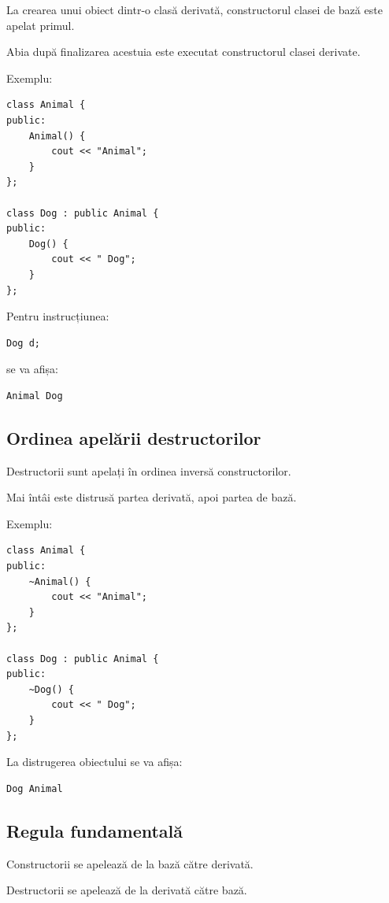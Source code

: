 \documentclass[12pt,a4paper]{article}
\begin{document}
La crearea unui obiect dintr-o clasă derivată, constructorul clasei de bază este apelat primul.

Abia după finalizarea acestuia este executat constructorul clasei derivate.

Exemplu:

\begin{verbatim}
class Animal {
public:
    Animal() {
        cout << "Animal";
    }
};

class Dog : public Animal {
public:
    Dog() {
        cout << " Dog";
    }
};
\end{verbatim}

Pentru instrucțiunea:

\begin{verbatim}
Dog d;
\end{verbatim}

se va afișa:

\begin{verbatim}
Animal Dog
\end{verbatim}

\subsection{Ordinea apelării destructorilor}

Destructorii sunt apelați în ordinea inversă constructorilor.

Mai întâi este distrusă partea derivată, apoi partea de bază.

Exemplu:

\begin{verbatim}
class Animal {
public:
    ~Animal() {
        cout << "Animal";
    }
};

class Dog : public Animal {
public:
    ~Dog() {
        cout << " Dog";
    }
};
\end{verbatim}

La distrugerea obiectului se va afișa:

\begin{verbatim}
Dog Animal
\end{verbatim}

\subsection{Regula fundamentală}

Constructorii se apelează de la bază către derivată.

Destructorii se apelează de la derivată către bază.
\end{document}
